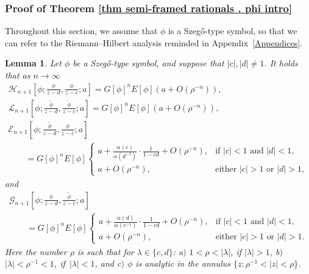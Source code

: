 \documentclass[10pt,a4paper]{amsart}
\numberwithin{equation}{section}
\newtheorem{Lemma}[Theorem]{Lemma}
 { \theoremstyle{definition}
\newtheorem{Definition}[Theorem]{Definition}
\newtheorem{Example}[Theorem]{Example}
\newtheorem{Remark}[Theorem]{Remark}
\newtheorem{Question}[Theorem]{Question}
}
\newcommand{\al}{\alpha}
\newcommand{\la}{\lambda}
\newcommand{\di}{\displaystyle}
\begin{document}
\subsubsection{Proof of Theorem \ref{thm semi-framed rationals . phi intro}}
		
		Throughout this section, we assume that $\phi$ is a Szeg\H{o}-type symbol, so that we can refer to the Riemann--Hilbert analysis reminded in Appendix~\ref{Appendices}.
		
		\begin{Lemma} Let $\phi$ be a Szeg\H{o}-type symbol, and suppose that $|c|, |d| \neq 1$. It holds that as $n \to \infty$
			\begin{gather}
				\mathscr{H}_{n+1}\left[\phi;\di \frac{\phi}{z-d}, \frac{\phi}{z-c} ;a\right] = G[\phi]^n E[\phi] (a + O(\rho^{-n})),\label{H phi . rational}
\\
				\mathscr{L}_{n+1}\left[\phi;\di \frac{\tilde{\phi}}{z-d}, \frac{\tilde{\phi}}{z-c} ;a\right] = G[\phi]^n E[\phi] (a + O(\rho^{-n})),\label{L phi . rational}
\\
				\mathscr{E}_{n+1}\left[\phi;\di \frac{\tilde{\phi}}{z-d}, \frac{\phi}{z-c} ;a\right] \nonumber\\
\qquad= G[\phi]^n E[\phi] \begin{cases}
					a+ \tfrac{\al(c)}{\al(d^{-1})}\cdot \tfrac{1}{1-cd}+O(\rho^{-n}), & \text{if $|c|<1$ and $|d|<1$}, \\
					a+O(\rho^{-n}), & \text{either $|c|>1$ or $|d|>1$},
				\end{cases}\label{E phi . rational}
			\end{gather}
			and
			\begin{gather}
				\mathscr{G}_{n+1}\left[\phi; \frac{\phi}{z-d}, \frac{\tilde{\phi}}{z-c} ;a\right]\nonumber\\
\qquad = G[\phi]^n E[\phi] \begin{cases}
					a+ \tfrac{\al(d)}{\al(c^{-1})}\cdot \tfrac{1}{1-cd}+O(\rho^{-n}), & \text{if $|c|<1$ and $|d|<1$}, \\
					a+O(\rho^{-n}), & \text{either $|c|>1$ or $|d|>1$}.
				\end{cases}\label{G phi . rational}
			\end{gather}
			Here the number $\rho$ is such that for $\la \in \{c,d\}$: a$)$ $1<\rho < |\la|$, if $|\la|>1$, b$)$ $|\la|<\rho^{-1}<1$, if~${|\la|<1}$, and c$)$ $\phi$ is analytic in the annulus $\big\{z\colon \rho^{-1}<|z|<\rho\big\}$.
		\end{Lemma}
\end{document}
